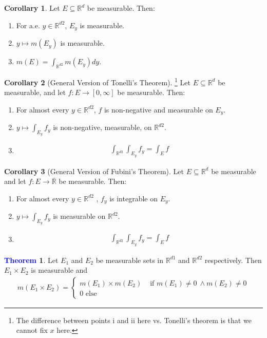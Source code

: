 \documentclass[reqno,11pt]{amsart}
\theoremstyle{definition}
\newcommand{\rd}[0]{\mathbb{R}^d}
\newcommand{\bb}[1]{\mathbb{#1}}
\newtheorem{theorem}{\textcolor{blue}{Theorem}}
\newtheorem{corollary}{Corollary}
\theoremstyle{definition}
\theoremstyle{remark}
\begin{document}
\begin{corollary}
	Let $E \subseteq \rd$ be measurable. Then: 
	\begin{enumerate}[noitemsep]
		\item For a.e. $y \in \bb{R}^{d2}$, $E_y$ is measurable. 
		\item $y \mapsto m(E_y)$ is measurable. 
		\item $m(E) = \int_{\bb{R}^{d2}} m(E_y)dy$. 
	\end{enumerate}
\end{corollary}

\begin{corollary}[General Version of Tonelli's Theorem]\footnote{The difference between points i and ii here vs. Tonelli's theorem is that we cannot fix $x$ here.} Let $E \subseteq \bb{R}^d$ be measurable, and let $f: E \rightarrow [0, \infty]$ be measurable. Then: 
	\begin{enumerate}[noitemsep]
		\item For almost every $y \in \bb{R}^{d2}$, $f$ is non-negative and measurable on $E_y$. 
		\item $y \mapsto \int_{E_y} f_y$ is non-negative, measurable, on $\bb{R}^{d2}$. 
		\item 
		\begin{align*}
		\int_{\bb{R}^{d2}} \int_{E_y} f_y = \int_E f 	
		\end{align*}
	\end{enumerate}
\end{corollary}

\begin{corollary}[General Version of Fubini's Theorem]
	Let $E \subseteq \rd$ be measurable and let $f: E \rightarrow \overline{\bb{R}}$ be measurable. Then: 
	\begin{enumerate}[noitemsep]
		\item For almost every $y \in \bb{R}^{d2}$ , $f_y$ is integrable on $E_y$. 
		\item $y \mapsto \int_{E_y} f_y$ is measurable on $\bb{R}^{d2}$. 
		\item 
		\begin{align*}	
			\int_{\bb{R}^{d2}} \int_{E_y} f_y = \int_E f 	
		\end{align*}
	\end{enumerate}
\end{corollary}

\begin{theorem}
	Let $E_1$ and $E_2$ be measurable sets in $\bb{R}^{d1}$ and $\bb{R}^{d2}$ respectively. Then $E_1 \times E_2$ is measurable and
	\begin{align*}
		m(E_1 \times E_2) = \begin{cases}
			m(E_1) \times m(E_2) & \mbox{ if } m(E_1) \neq 0\ \land m(E_2) \neq 0 \\
			0 \mbox{ else } 
		\end{cases}	
	\end{align*}
\end{theorem}
\end{document}
